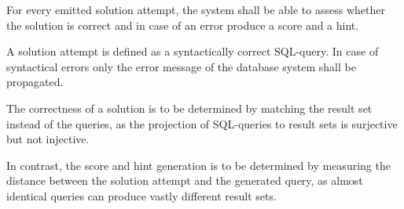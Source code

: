 For every emitted solution attempt, the system shall be able to assess whether the solution is correct and in case of an error produce a score and a hint.

A solution attempt is defined as a syntactically correct SQL-query. In case of syntactical errors only the error message of the database system shall be propagated.

The correctness of a solution is to be determined by matching the result set instead of the queries, as the projection of SQL-queries to result sets is surjective but not injective.

In contrast, the score and hint generation is to be determined by measuring the distance between the solution attempt and the generated query, as almost identical queries can produce vastly different result sets.